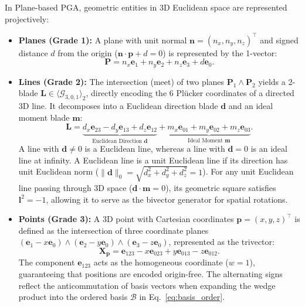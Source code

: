 \documentclass[10pt]{article}
\begin{document}
In Plane-based PGA, geometric entities in 3D Euclidean space are represented projectively:
\begin{itemize}
    \item \textbf{Planes (Grade 1):} A plane with unit normal $\mathbf{n} = (n_x, n_y, n_z)^\top$ and signed distance $d$ from the origin ($\mathbf{n} \cdot \mathbf{p} + d = 0$) is represented by the 1-vector:
    \begin{equation}
        \mathbf{P} = n_x \mathbf{e}_1 + n_y \mathbf{e}_2 + n_z \mathbf{e}_3 + d \mathbf{e}_0.
    \end{equation}

    \item \textbf{Lines (Grade 2):} The intersection (meet) of two planes $\mathbf{P}_1 \wedge \mathbf{P}_2$ yields a 2-blade $\mathbf{L} \in \langle \mathcal{G}_{3,0,1} \rangle_2$, directly encoding the 6 Plücker coordinates of a directed 3D line. It decomposes into a Euclidean direction blade $\mathbf{d}$ and an ideal moment blade $\mathbf{m}$:
    \begin{equation}
        \mathbf{L} = \underbrace{d_x \mathbf{e}_{23} - d_y \mathbf{e}_{13} + d_z \mathbf{e}_{12}}_{\text{Euclidean Direction } \mathbf{d}} + \underbrace{m_x \mathbf{e}_{01} + m_y \mathbf{e}_{02} + m_z \mathbf{e}_{03}}_{\text{Ideal Moment } \mathbf{m}}.
    \end{equation}
    A line with $\mathbf{d} \neq 0$ is a Euclidean line, whereas a line with $\mathbf{d} = 0$ is an ideal line at infinity. A Euclidean line is a unit Euclidean line if its direction has unit Euclidean norm ($\|\mathbf{d}\|_0 = \sqrt{d_x^2 + d_y^2 + d_z^2} = 1$). For any unit Euclidean line passing through 3D space ($\mathbf{d} \cdot \mathbf{m} = 0$), its geometric square satisfies $\mathbf{l}^2 = -1$, allowing it to serve as the bivector generator for spatial rotations.

    \item \textbf{Points (Grade 3):} A 3D point with Cartesian coordinates $\mathbf{p} = (x, y, z)^\top$ is defined as the intersection of three coordinate planes $(\mathbf{e}_1 - x\mathbf{e}_0) \wedge (\mathbf{e}_2 - y\mathbf{e}_0) \wedge (\mathbf{e}_3 - z\mathbf{e}_0)$, represented as the trivector:
    \begin{equation}
        \mathbf{X}_{\mathbf{p}} = \mathbf{e}_{123} - x \mathbf{e}_{023} + y \mathbf{e}_{013} - z \mathbf{e}_{012}.
        \label{eq:point_repr}
    \end{equation}
    The component $\mathbf{e}_{123}$ acts as the homogeneous coordinate ($w=1$), guaranteeing that positions are encoded origin-free. The alternating signs reflect the anticommutation of basis vectors when expanding the wedge product into the ordered basis $\mathcal{B}$ in Eq.~\ref{eq:basis_order}.
\end{itemize}
\end{document}
